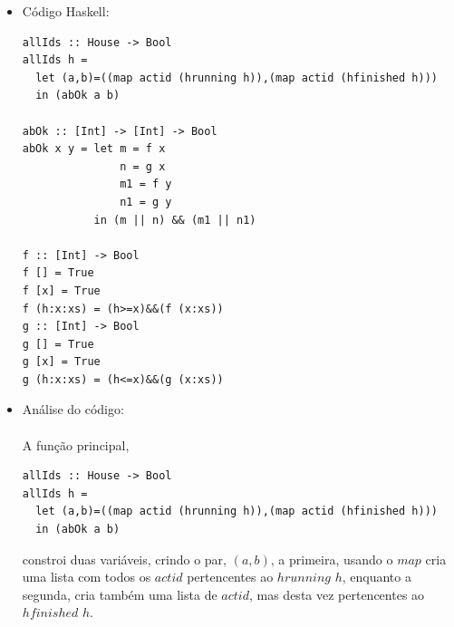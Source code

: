 \documentclass[a4paper]{article}
\begin{document}
\begin{enumerate}
\begin{itemize}
\begin {verbatim}
\item
Será que $idKey$ implica $idsOk$? Ou será que $idsOk$ é que implica $idKey$?
      Ou nenhuma dessas implicações se verifica? Justifique a sua resposta.
\paragraph{}Na nossa opinião $idKey$ implica $idsOk$ pelo facto de, sabendo que $idsOk$ toma o valor lógico $Tru$e então $idKey$ toma de imediato o mesmo valor de $True$ e sendo o contrario, havendo $actid$ repetidos é que $idKey$ faz a sua verificação.


\item
Acrescentar o predicado $allIds :: House -> Bool$ que verifica se a alocação de identificadores a leilões é sequencial.
\begin{itemize}
\item {Tipo de dados:}
\begin{verbatim}
      allIds :: House -> Bool
\end{verbatim}
\paragraph{}O objetivo e ao receber um $House$, teste ($Bool$) se os identificadorres de um leilão estao de forma sequencial, quer seja crescente quer decrescente.
\newpage
\item {Código Haskell:}
\begin{verbatim}
allIds :: House -> Bool
allIds h = 
  let (a,b)=((map actid (hrunning h)),(map actid (hfinished h)))
  in (abOk a b)

abOk :: [Int] -> [Int] -> Bool
abOk x y = let m = f x
               n = g x
               m1 = f y
               n1 = g y
           in (m || n) && (m1 || n1)

f :: [Int] -> Bool 
f [] = True
f [x] = True 
f (h:x:xs) = (h>=x)&&(f (x:xs))
g :: [Int] -> Bool
g [] = True
g [x] = True 
g (h:x:xs) = (h<=x)&&(g (x:xs))
\end{verbatim}

\item {Análise do código:}
\paragraph{}A função principal,
\begin{verbatim}
allIds :: House -> Bool
allIds h = 
  let (a,b)=((map actid (hrunning h)),(map actid (hfinished h)))
  in (abOk a b)
\end{verbatim}
constroi duas variáveis, crindo o par, $(a,b)$, a primeira, usando o $map$ cria uma lista com todos os $actid$ pertencentes ao $hrunning$ $h$, enquanto a segunda, cria também uma lista de $actid$, mas desta vez pertencentes ao $hfinished$ $h$.

\end{itemize}
\end{enumerate}
\end{document}
